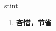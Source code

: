 
\begin{frame}
{\huge stint}
\begin{center}
\begin{enumerate}\Large
  \item \textbf{吝惜，节省}
\end{enumerate}
\end{center}
\end{frame}
